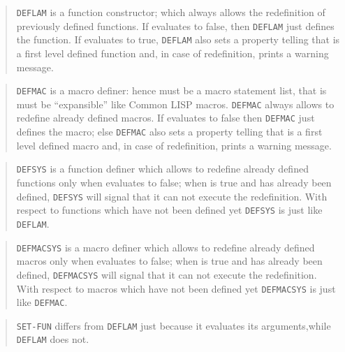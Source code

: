 \bigskip

\begin{quote}
	{\tt DEFLAM} is a function constructor; which always allows the redefinition
	of previously defined functions.
	If {\tt\infmode} evaluates to false, then {\tt DEFLAM} just defines the
	function.
	If {\tt\infmode} evaluates to true, {\tt DEFLAM} also sets a property
	telling that {\it \sbrna\/} is a first level defined function and, in case
	of redefinition, prints a warning message.
\end{quote}

\begin{quote}
	{\tt DEFMAC} is a macro definer: hence {\it \sbrbo\/} must be a macro
	statement list, that is must be ``expansible'' like Common LISP macros.
	{\tt DEFMAC} always allows to redefine already defined macros.
	If {\tt\infmode} evaluates to false then {\tt DEFMAC} just defines the
	macro; else {\tt DEFMAC} also sets a property telling that {\it \sbrna} is a
	first level defined macro and, in case of redefinition, prints a warning
	message. 
\end{quote}

\begin{quote}
	{\tt DEFSYS} is a function definer which allows to redefine already defined
	functions only when {\tt\infmode} evaluates to false; when {\tt\infmode} is
	true and {\it \sbrna} has already been defined, {\tt DEFSYS} will signal
	that it can not execute the redefinition.
	With respect to functions which have not been defined yet {\tt DEFSYS} is
	just like {\tt DEFLAM}.
\end{quote}

\begin{quote}
	{\tt DEFMACSYS} is a macro definer which allows to redefine already defined
	macros only when {\tt\infmode} evaluates to false; when {\tt\infmode} is
	true and {\it \sbrna} has already been defined, {\tt DEFMACSYS} will signal
	that it can not execute the redefinition.
	With respect to macros which have not been defined yet {\tt DEFMACSYS} is
	just like {\tt DEFMAC}. 
\end{quote}

\begin{quote}
	{\tt SET-FUN} differs from {\tt DEFLAM} just because it evaluates its
	arguments,while {\tt DEFLAM} does not.
\end{quote}

